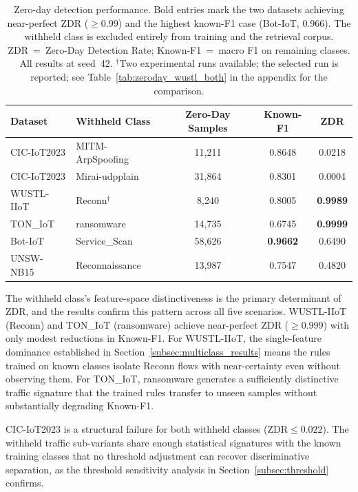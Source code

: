 \begin{table}[htbp]
\centering
\caption{Zero-day detection performance. Bold entries mark the two datasets achieving near-perfect ZDR ($\geq 0.99$) and the highest known-F1 case (Bot-IoT, $0.966$). The withheld class is excluded entirely from training and the retrieval corpus. ZDR~=~Zero-Day Detection Rate; Known-F1~=~macro F1 on remaining classes. All results at seed~42. $^\dagger$Two experimental runs available; the selected run is reported; see Table~\ref{tab:zeroday_wustl_both} in the appendix for the comparison.}
\label{tab:zeroday_summary}
\begin{tabular}{llccc}
\toprule
\textbf{Dataset} & \textbf{Withheld Class} & \textbf{Zero-Day Samples} & \textbf{Known-F1} & \textbf{ZDR} \\
\midrule
CIC-IoT2023  & MITM-ArpSpoofing  & 11{,}211 & 0.8648 & 0.0218 \\
CIC-IoT2023  & Mirai-udpplain    & 31{,}864 & 0.8301 & 0.0004 \\
WUSTL-IIoT   & Reconn$^\dagger$  & 8{,}240  & 0.8005 & \textbf{0.9989} \\
TON\_IoT     & ransomware        & 14{,}735 & 0.6745 & \textbf{0.9999} \\
Bot-IoT      & Service\_Scan     & 58{,}626 & \textbf{0.9662} & 0.6490 \\
UNSW-NB15    & Reconnaissance    & 13{,}987 & 0.7547 & 0.4820 \\
\bottomrule
\end{tabular}
\end{table}

The withheld class's feature-space distinctiveness is the primary determinant of ZDR, and the results confirm this pattern across all five scenarios. WUSTL-IIoT (Reconn) and TON\_IoT (ransomware) achieve near-perfect ZDR ($\geq 0.999$) with only modest reductions in Known-F1. For WUSTL-IIoT, the single-feature dominance established in Section~\ref{subsec:multiclass_results} means the rules trained on known classes isolate Reconn flows with near-certainty even without observing them. For TON\_IoT, ransomware generates a sufficiently distinctive traffic signature that the trained rules transfer to unseen samples without substantially degrading Known-F1.

CIC-IoT2023 is a structural failure for both withheld classes ($\text{ZDR} \leq 0.022$). The withheld traffic sub-variants share enough statistical signatures with the known training classes that no threshold adjustment can recover discriminative separation, as the threshold sensitivity analysis in Section~\ref{subsec:threshold} confirms.

